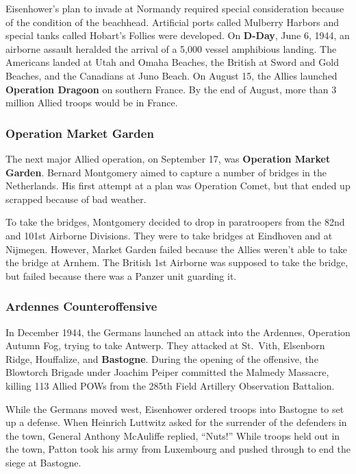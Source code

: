 Eisenhower's plan to invade at Normandy required special consideration because of the condition of the beachhead.
Artificial ports called Mulberry Harbors and special tanks called Hobart's Follies were developed.
On \textbf{D-Day}, June 6, 1944, an airborne assault heralded the arrival of a 5,000 vessel amphibious landing.
The Americans landed at Utah and Omaha Beaches,
the British at Sword and Gold Beaches,
and the Canadians at Juno Beach.
On August 15, the Allies launched \textbf{Operation Dragoon} on southern France.
By the end of August, more than 3 million Allied troops would be in France.

\subsubsection*{Operation Market Garden}

The next major Allied operation, on September 17, was \textbf{Operation Market Garden}.
Bernard Montgomery aimed to capture a number of bridges in the Netherlands.
His first attempt at a plan was Operation Comet, but that ended up scrapped because of bad weather.

To take the bridges, Montgomery decided to drop in paratroopers from the 82nd and 101st Airborne Divisions.
They were to take bridges at Eindhoven and at Nijmegen.
However, Market Garden failed because the Allies weren't able to take the bridge at Arnhem.
The British 1st Airborne was supposed to take the bridge, but failed because there was a Panzer unit guarding it.

\subsubsection*{Ardennes Counteroffensive}

In December 1944, the Germans launched an attack into the Ardennes, Operation Autumn Fog,
trying to take Antwerp.
They attacked at St.\ Vith, Elsenborn Ridge, Houffalize, and \textbf{Bastogne}.
During the opening of the offensive, the Blowtorch Brigade under Joachim Peiper committed the Malmedy Massacre,
killing 113 Allied POWs from the 285th Field Artillery Observation Battalion.

While the Germans moved west, Eisenhower ordered troops into Bastogne to set up a defense.
When Heinrich Luttwitz asked for the surrender of the defenders in the town,
General Anthony McAuliffe replied, ``Nuts!''
While troops held out in the town,
Patton took his army from Luxembourg and pushed through to end the siege at Bastogne.


